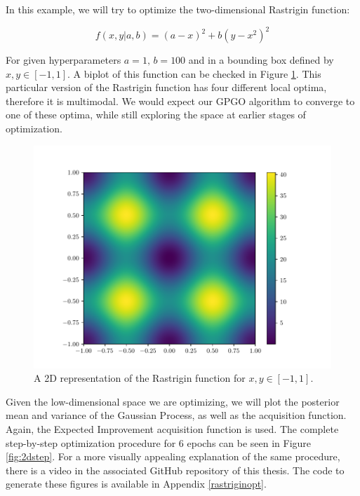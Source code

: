 \documentclass[10pt,a4paper,twoside]{book}
\begin{document}
In this example, we will try to optimize the two-dimensional Rastrigin function:

\begin{equation}
f(x, y| a, b) = (a - x)^2 + b(y - x^2)^2
\end{equation}

For given hyperparameters $a=1,\, b=100$ and in a bounding box defined by $x,y \in [-1, 1]$. A biplot of this function can be checked in Figure \ref{fig:rosen}. This particular version of the Rastrigin function has four different local optima, therefore it is multimodal. We would expect our GPGO algorithm to converge to one of these optima, while still exploring the space at earlier stages of optimization.\\

\begin{figure}
	\centering
	\caption{A 2D representation of the Rastrigin function for $x, y \in [-1, 1]$.}
	\label{fig:rosen}
	\includegraphics[scale=0.5]{figures/chapter3/rosen/rosen}
\end{figure}

Given the low-dimensional space we are optimizing, we will plot the posterior mean and variance of the Gaussian Process, as well as the acquisition function. Again, the Expected Improvement acquisition function is used. The complete step-by-step optimization procedure for 6 epochs can be seen in Figure \ref{fig:2dstep}. For a more visually appealing explanation of the same procedure, there is a video in the associated GitHub repository of this thesis. The code to generate these figures is available in Appendix \ref{rastriginopt}.\\
\end{document}
